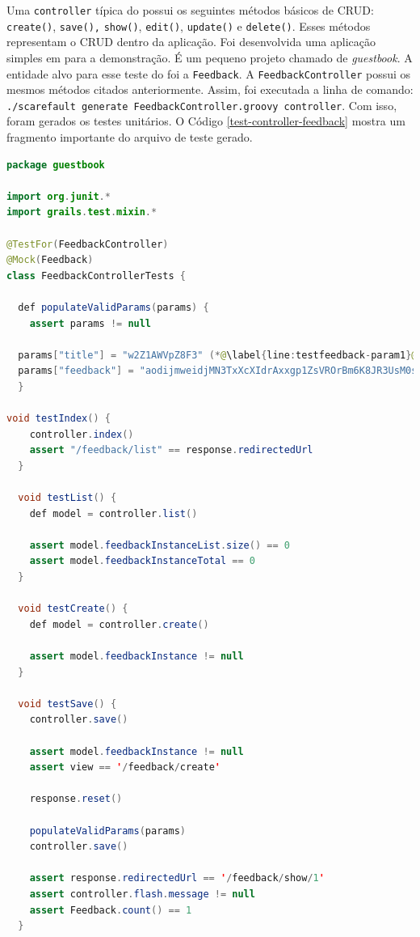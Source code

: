 Uma \lstinline|controller| típica do \grails possui os seguintes métodos básicos de CRUD:
\lstinline|create()|, \lstinline|save(),| \lstinline|show()|, \lstinline|edit()|,
\lstinline|update()| e \lstinline|delete()|. Esses métodos representam
o CRUD dentro da aplicação. Foi desenvolvida uma aplicação simples em
\grails para a demonstração. É um pequeno projeto chamado de \textit{guestbook}.
A entidade alvo para esse teste do \framework foi a \lstinline|Feedback|.
A \lstinline|FeedbackController| possui os mesmos métodos citados anteriormente.
Assim, foi executada a linha de comando:
\lstinline|./scarefault generate FeedbackController.groovy controller|. Com isso,
foram gerados os testes unitários. O Código \ref{test-controller-feedback}
mostra um fragmento importante do arquivo de teste gerado.
\begin{lstlisting}[language=java, label=test-controller-feedback, caption=Fragmento do arquivo de teste gerado para a \lstinline|FeedbackController|]
package guestbook

import org.junit.*
import grails.test.mixin.*

@TestFor(FeedbackController)
@Mock(Feedback)
class FeedbackControllerTests {

  def populateValidParams(params) {
    assert params != null

  params["title"] = "w2Z1AWVpZ8F3" (*@\label{line:testfeedback-param1}@*)
  params["feedback"] = "aodijmweidjMN3TxXcXIdrAxxgp1ZsVROrBm6K8JR3UsM0stcSFINRHL87O" (*@\label{line:testfeedback-param2}@*)
  }
 
void testIndex() {
    controller.index()
    assert "/feedback/list" == response.redirectedUrl
  }

  void testList() {
    def model = controller.list()

    assert model.feedbackInstanceList.size() == 0
    assert model.feedbackInstanceTotal == 0
  }

  void testCreate() {
    def model = controller.create()

    assert model.feedbackInstance != null
  }

  void testSave() {
    controller.save()

    assert model.feedbackInstance != null
    assert view == '/feedback/create'

    response.reset()

    populateValidParams(params)
    controller.save()

    assert response.redirectedUrl == '/feedback/show/1'
    assert controller.flash.message != null
    assert Feedback.count() == 1
  }


\end{lstlisting}

